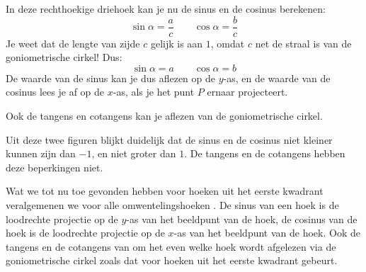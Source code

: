 

In deze rechthoekige driehoek kan je nu de sinus en de cosinus berekenen:
\[\sin \alpha = \frac{a}{c} \qquad \cos \alpha = \frac{b}{c}\]
Je weet dat de lengte van zijde $c$ gelijk is aan $1$, omdat $c$ net de straal is van de goniometrische cirkel! Dus:
\[\sin \alpha = a \qquad \cos \alpha = b\]
De waarde van de sinus kan je dus aflezen op de $y$-as, en de waarde van de cosinus lees je af op de $x$-as, als je het punt $P$ ernaar projecteert.



Ook de tangens en cotangens kan je aflezen van de goniometrische cirkel.



Uit deze twee figuren blijkt duidelijk dat de sinus en de cosinus niet kleiner kunnen zijn dan $-1$, en niet groter dan $1$. De tangens en de cotangens hebben deze beperkingen niet.

Wat we tot nu toe gevonden hebben voor hoeken uit het eerste kwadrant veralgemenen we voor alle omwentelingshoeken .
De sinus van een hoek is de loodrechte projectie op de $y$-as van het beeldpunt van de hoek, de cosinus van de hoek is de loodrechte projectie op de $x$-as van het beeldpunt van de hoek.
Ook de tangens en de cotangens van om het even welke hoek wordt afgelezen via de goniometrische cirkel zoals dat voor hoeken uit het eerste kwadrant gebeurt.

